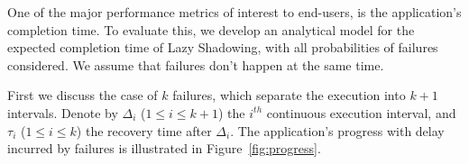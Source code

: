 One of the major performance metrics of interest to end-users, is the application's completion time. 
To evaluate this, we develop an analytical model for the expected completion time of Lazy Shadowing, with all probabilities of failures considered. We assume that failures don't happen at the same time.

First we discuss the case of $k$ failures, which separate the execution into $k+1$ intervals.
Denote by $\Delta_i$ ($1\le i \le k+1$) the $i^{th}$ continuous execution interval, and $\tau_i$ ($1\le i \le k$) the recovery time after $\Delta_i$. 
The application's progress with delay incurred by failures is illustrated in Figure~\ref{fig:progress}.

